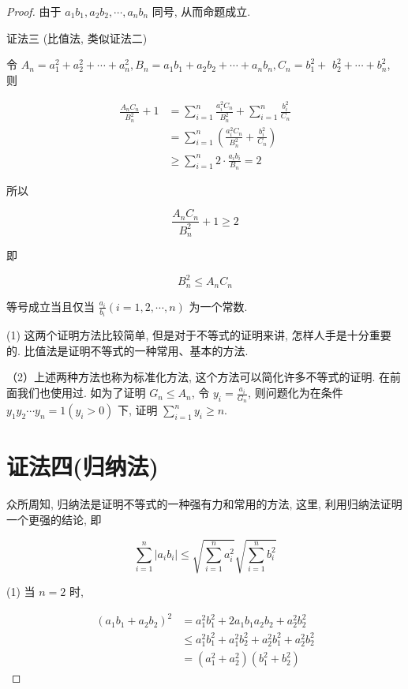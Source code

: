 \begin{proof}
	由于 $a_{1} b_{1}, a_{2} b_{2}, \cdots, a_{n} b_{n}$ 同号, 从而命题成立.
	
	证法三 (比值法, 类似证法二)
	
	令 $A_{n}=a_{1}^{2}+a_{2}^{2}+\cdots+a_{n}^{2}, B_{n}=a_{1} b_{1}+a_{2} b_{2}+\cdots+a_{n} b_{n}, C_{n}=b_{1}^{2}+$ $b_{2}^{2}+\cdots+b_{n}^{2}$, 则
	
	$$
	\begin{aligned}
	\frac{A_{n} C_{n}}{B_{n}^{2}}+1 & =\sum_{i=1}^{n} \frac{a_{i}^{2} C_{n}}{B_{n}^{2}}+\sum_{i=1}^{n} \frac{b_{i}^{2}}{C_{n}} \\
	& =\sum_{i=1}^{n}\left(\frac{a_{i}^{2} C_{n}}{B_{n}^{2}}+\frac{b_{i}^{2}}{C_{n}}\right) \\
	& \geqslant \sum_{i=1}^{n} 2 \cdot \frac{a_{i} b_{i}}{B_{n}}=2
	\end{aligned}
	$$
	
	所以
	
	$$
	\frac{A_{n} C_{n}}{B_{n}^{2}}+1 \geqslant 2
	$$
	
	即
	
	$$
	B_{n}^{2} \leqslant A_{n} C_{n}
	$$
	
	等号成立当且仅当 $\frac{a_{i}}{b_{i}}(i=1,2, \cdots, n)$ 为一个常数.

	(1) 这两个证明方法比较简单, 但是对于不等式的证明来讲, 怎样人手是十分重要的. 比值法是证明不等式的一种常用、基本的方法.
	
	（2）上述两种方法也称为标准化方法, 这个方法可以简化许多不等式的证明. 在前面我们也使用过. 如为了证明 $G_{n} \leqslant A_{n}$, 令 $y_{i}=\frac{a_{i}}{G_{n}}$, 则问题化为在条件 $y_{1} y_{2} \cdots y_{n}=1\left(y_{i}>0\right)$ 下, 证明 $\sum_{i=1}^{n} y_{i} \geqslant n$.
	
	\section*{证法四(归纳法)}
	众所周知, 归纳法是证明不等式的一种强有力和常用的方法, 这里, 利用归纳法证明一个更强的结论, 即
	
	$$
	\sum_{i=1}^{n}\left|a_{i} b_{i}\right| \leqslant \sqrt{\sum_{i=1}^{n} a_{i}^{2}} \sqrt{\sum_{i=1}^{n} b_{i}^{2}}
	$$
	
	(1) 当 $n=2$ 时,
	
	$$
	\begin{aligned}
	\left(a_{1} b_{1}+a_{2} b_{2}\right)^{2} & =a_{1}^{2} b_{1}^{2}+2 a_{1} b_{1} a_{2} b_{2}+a_{2}^{2} b_{2}^{2} \\
	& \leqslant a_{1}^{2} b_{1}^{2}+a_{1}^{2} b_{2}^{2}+a_{2}^{2} b_{1}^{2}+a_{2}^{2} b_{2}^{2} \\
	& =\left(a_{1}^{2}+a_{2}^{2}\right)\left(b_{1}^{2}+b_{2}^{2}\right)
	\end{aligned}
	$$
	

\end{proof}
